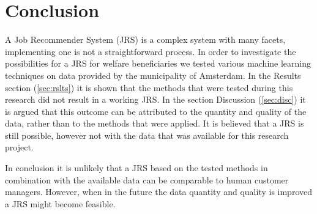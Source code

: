 \section{Conclusion}
\label{sec:concl}

A Job Recommender System (JRS) is a complex system with many facets, implementing one is not a straightforward process.
In order to investigate the possibilities for a JRS for welfare beneficiaries we tested various machine learning techniques on data provided by the municipality of Amsterdam.
In the Results section (\ref{sec:rslts}) it is shown that the methods that were tested during this research did not result in a working JRS.
In the section Discussion (\ref{sec:disc}) it is argued that this outcome can be attributed to the quantity and quality of the data, rather than to the methods that were applied.
It is believed that a JRS is still possible, however not with the data that was available for this research project.

In conclusion it is unlikely that a JRS based on the tested methods in combination with the available data can be comparable to human customer managers.
However, when in the future the data quantity and quality is improved a JRS might become feasible.